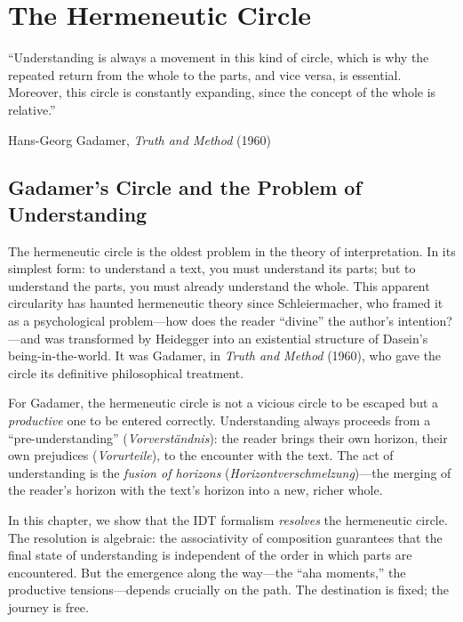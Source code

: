 

\chapter{The Hermeneutic Circle}
\label{ch:hermeneutic-circle}

\epigraph{``Understanding is always a movement in this kind of circle, which is
why the repeated return from the whole to the parts, and vice versa, is
essential. Moreover, this circle is constantly expanding, since the concept
of the whole is relative.''}{Hans-Georg Gadamer, \textit{Truth and Method} (1960)}

\section{Gadamer's Circle and the Problem of Understanding}

The hermeneutic circle is the oldest problem in the theory of interpretation.
In its simplest form: to understand a text, you must understand its parts; but
to understand the parts, you must already understand the whole. This apparent
circularity has haunted hermeneutic theory since Schleiermacher, who framed it
as a psychological problem---how does the reader ``divine'' the author's
intention?---and was transformed by Heidegger into an existential structure of
Dasein's being-in-the-world. It was Gadamer, in \textit{Truth and Method}
(1960), who gave the circle its definitive philosophical treatment.

For Gadamer, the hermeneutic circle is not a vicious circle to be escaped but a
\emph{productive} one to be entered correctly. Understanding always proceeds
from a ``pre-understanding'' (\textit{Vorverst\"andnis}): the reader brings their
own horizon, their own prejudices (\textit{Vorurteile}), to the encounter with
the text. The act of understanding is the \emph{fusion of horizons}
(\textit{Horizontverschmelzung})---the merging of the reader's horizon with
the text's horizon into a new, richer whole.

In this chapter, we show that the IDT formalism \emph{resolves} the
hermeneutic circle. The resolution is algebraic: the associativity of
composition guarantees that the final state of understanding is independent
of the order in which parts are encountered. But the emergence along the
way---the ``aha moments,'' the productive tensions---depends crucially on
the path. The destination is fixed; the journey is free.


